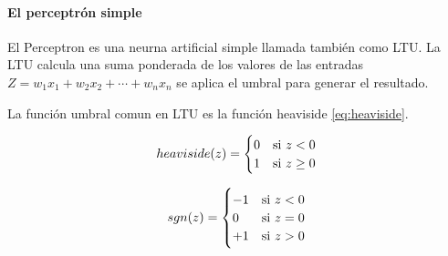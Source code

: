 
\paragraph*{El perceptrón simple}

El Perceptron es una neurna artificial simple llamada también como \gls{LTU}. La \gls{LTU} calcula una suma ponderada de los valores de las entradas $Z = w_{1} x_{1} + w_{2} x_{2} + \cdots + w_{n} x_{n}$ se aplica el umbral para generar el resultado.

La función umbral comun en \gls{LTU} es la función heaviside \ref{eq:heaviside}.

\noindent\begin{minipage}{0.45\textwidth}
    \begin{equation*}
        heaviside(z) =
        \begin{cases}
            0 & \textup{si } z < 0       \\
            1 & \textup{si } z \geq{}  0
        \end{cases}
    \end{equation*}
\end{minipage}
\begin{minipage}{0.45\textwidth}
    \begin{equation}
        sgn(z) =
        \begin{cases}
            -1 & \textup{si } z < 0  \\
            0  & \textup{si } z = 0  \\
            +1 & \textup{si } z >  0
        \end{cases}
        \label{eq:heaviside}
    \end{equation}
\end{minipage}

